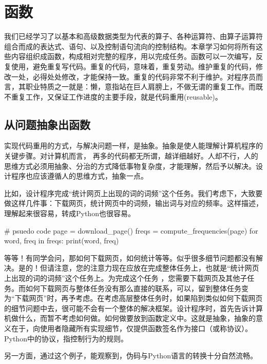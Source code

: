 \chapter{函数}
我们已经学习了以基本和高级数据类型为代表的算子、各种运算符、由算子运算符组合而成的表达式、语句、以及控制语句流向的控制结构。本章学习如何将所有这些内容组织成函数，构成相对完整的程序，用以完成任务。函数可以一次编写，反复使用，避免重复写代码。重复的代码，意味着，重复劳动。维护重复的代码，修改一处，必得处处修改，才能保持一致。重复的代码非常不利于维护。对程序员而言，其职业特质之一就是：懒，意指站在巨人肩膀上，不做无谓的重复工作。而既不重复工作，又保证工作进度的主要手段，就是代码重用(reusable)。

\section{从问题抽象出函数}
实现代码重用的方式，与解决问题一样，是抽象。抽象是使人能理解计算机程序的关键步骤。对计算机而言， 再多的代码都无所谓，越详细越好。人却不行，人的思维方式必须用抽象、分治的方式降低事物复杂度，才能理解，然后予以解决。设计程序也应该遵循人的思维方式，抽象一点。

比如，设计程序完成“统计网页上出现的词的词频”这个任务。我们考虑下，大致要做这样几件事：下载网页，统计网页中的词频，输出词与对应的频率。这样描述，理解起来很容易，转成Python也很容易。
\begin{python}
  # psuedo code
  page = download_page()
  freqs = compute_frequencies(page)
  for word, freq in freqs:
      print(word, freq)
\end{python}
等等！有同学会问，那如何下载网页，如何统计等等。似乎很多细节问题都没有解决。是的！但请注意，您的注意力现在应放在完成整体任务上，也就是“统计网页上出现的词的词频”这个任务上。为完成这个任务 ，您需要下载网页及其他子任务。而如何下载网页与整体任务没有那么直接的联系，可以，留到整体任务变为“下载网页”时，再予考虑。在考虑高层整体任务时，如果陷到类似如何下载网页的细节问题中去，很可能不会有一个整体的解决框架。设计程序时，首先告诉计算机做什么，而暂不考虑如何做。如何做要放到函数定义中。这就是抽象，抽象的意义在于，向使用者隐藏所有实现细节，仅提供函数签名作为接口（或称协议）。Python中的协议，指控制行为的规则。

另一方面，通过这个例子，能观察到，伪码与Python语言的转换十分自然流畅。
